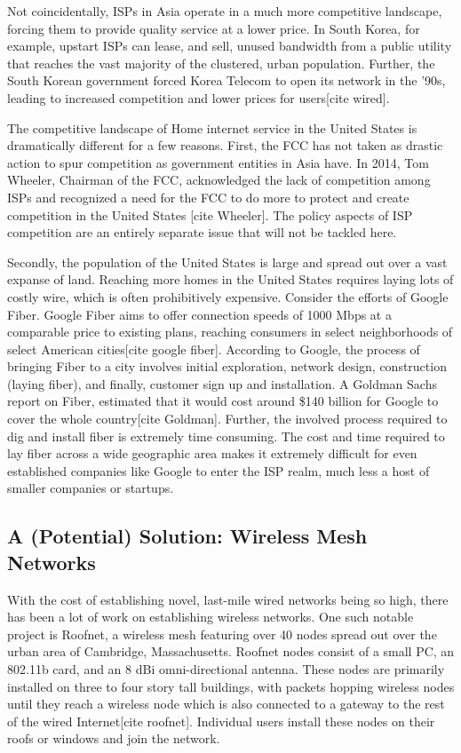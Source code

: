 \documentclass[pageno]{jpaper}
\begin{document}
Not coincidentally, ISPs in Asia operate in a much more competitive landscape, forcing them to provide quality service at a lower price. In South Korea, for example, upstart ISPs can lease, and sell, unused bandwidth from a public utility that reaches the vast majority of the clustered, urban population. Further, the South Korean government forced Korea Telecom to open its network in the '90s, leading to increased competition and lower prices for users[cite wired]. 

The competitive landscape of Home internet service in the United States is dramatically different for a few reasons. First, the FCC has not taken as drastic action to spur competition as government entities in Asia have. In 2014, Tom Wheeler, Chairman of the FCC, acknowledged the lack of competition among ISPs and recognized a need for the FCC to do more to protect and create competition in the United States [cite Wheeler]. The policy aspects of ISP competition are an entirely separate issue that will not be tackled here. 

Secondly, the population of the United States is large and spread out over a vast expanse of land. Reaching more homes in the United States requires laying lots of costly wire, which is often prohibitively expensive. Consider the efforts of Google Fiber. Google Fiber aims to offer connection speeds of 1000 Mbps at a comparable price to existing plans, reaching consumers in select neighborhoods of select American cities[cite google fiber]. According to Google, the process of bringing Fiber to a city involves initial exploration, network design, construction (laying fiber), and finally, customer sign up and installation. A Goldman Sachs report on Fiber, estimated that it would cost around \$140 billion for Google to cover the whole country[cite Goldman]. Further, the involved process required to dig and install fiber is extremely time consuming. The cost and time required to lay fiber across a wide geographic area makes it extremely difficult for even established companies like Google to enter the ISP realm, much less a host of smaller companies or startups.
\subsection{A (Potential) Solution: Wireless Mesh Networks}
With the cost of establishing novel, last-mile wired networks being so high, there has been a lot of work on establishing wireless networks. One such notable project is Roofnet, a wireless mesh featuring over 40 nodes spread out over the urban area of Cambridge, Massachusetts. Roofnet nodes consist of a small PC, an 802.11b card, and an 8 dBi omni-directional antenna. These nodes are primarily installed on three to four story tall buildings, with packets hopping wireless nodes until they reach a wireless node which is also connected to a gateway to the rest of the wired Internet[cite roofnet]. Individual users install these nodes on their roofs or windows and join the network. 
\end{document}
